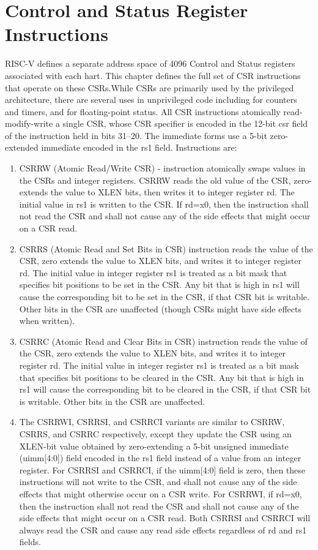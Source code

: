 \documentclass{scrreprt}
\begin{document}
\section*{Control and Status Register Instructions}
RISC-V defines a separate address space of 4096 Control and Status registers associated with each hart. This chapter defines the full set of CSR instructions that operate on these CSRs.While CSRs are primarily used by the privileged architecture, there are several uses in unprivileged code including for counters and timers, and for floating-point status.
\hfill \break
All CSR instructions atomically read-modify-write a single CSR, whose CSR specifier is encoded
in the 12-bit csr field of the instruction held in bits 31–20. The immediate forms use a 5-bit
zero-extended immediate encoded in the rs1 field.
Instructions are: 
\begin{enumerate}
    \item CSRRW (Atomic Read/Write CSR) - instruction atomically swaps values in the CSRs and integer registers. CSRRW reads the old value of the CSR, zero-extends the value to XLEN bits, then writes it to integer register rd. The initial value in rs1 is written to the CSR. If rd=x0, then the instruction shall not read the CSR and shall not cause any of the side effects that might occur on a CSR read.
    \item CSRRS (Atomic Read and Set Bits in CSR) instruction reads the value of the CSR, zero extends the value to XLEN bits, and writes it to integer register rd. The initial value in integer register rs1 is treated as a bit mask that specifies bit positions to be set in the CSR. Any bit that is high in rs1 will cause the corresponding bit to be set in the CSR, if that CSR bit is writable. Other bits in the CSR are unaffected (though CSRs might have side effects when written).
    \item  CSRRC (Atomic Read and Clear Bits in CSR) instruction reads the value of the CSR, zero extends the value to XLEN bits, and writes it to integer register rd. The initial value in integer register rs1 is treated as a bit mask that specifies bit positions to be cleared in the CSR. Any bit that is high in rs1 will cause the corresponding bit to be cleared in the CSR, if that CSR bit is writable. Other bits in the CSR are unaffected.
    \item The CSRRWI, CSRRSI, and CSRRCI variants are similar to CSRRW, CSRRS, and CSRRC respectively, except they update the CSR using an XLEN-bit value obtained by zero-extending a 5-bit unsigned immediate (uimm[4:0]) field encoded in the rs1 field instead of a value from an integer register. For CSRRSI and CSRRCI, if the uimm[4:0] field is zero, then these instructions will not write to the CSR, and shall not cause any of the side effects that might otherwise occur on a CSR write. For CSRRWI, if rd=x0, then the instruction shall not read the CSR and shall not cause any of the side effects that might occur on a CSR read. Both CSRRSI and CSRRCI will always read the CSR and cause any read side effects regardless of rd and rs1 fields.
\end{enumerate}
\end{document}
